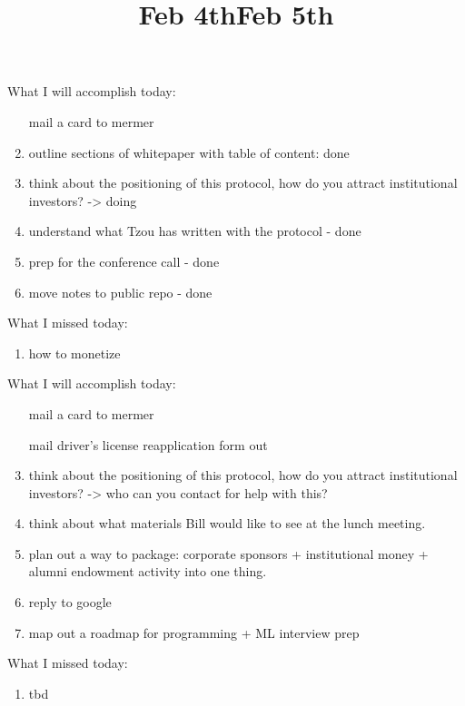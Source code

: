 \title{Feb 4th}

What I will accomplish today:

\begin{enumerate}
	\item [mail a card to mermer]
	\item outline sections of whitepaper with table of content:  done
	\item think about the positioning of this protocol, how do you attract institutional investors?  -> doing
	\item understand what Tzou has written with the protocol  - done
	\item prep for the conference call - done
	\item move notes to public repo - done
\end{enumerate}

What I missed today: 

\begin{enumerate}
	\item how to monetize
\end{enumerate}



\title{Feb 5th}

What I will accomplish today:

\begin{enumerate}
	\item [mail a card to mermer]
	\item [mail driver's license reapplication form out]
	\item think about the positioning of this protocol, how do you attract institutional investors?   -> who can you contact for help with this?
	\item think about what materials Bill would like to see at the lunch meeting.
	\item plan out a way to package: corporate sponsors + institutional money + alumni endowment activity  into one thing. 
	\item reply to google
	\item map out a roadmap for programming + ML interview prep
\end{enumerate}

What I missed today: 

\begin{enumerate}
	\item tbd
\end{enumerate}












